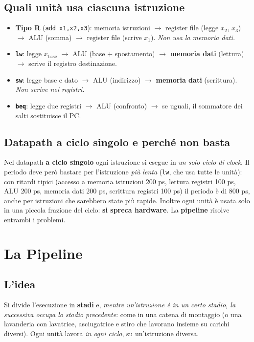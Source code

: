 \subsection{Quali unità usa ciascuna istruzione}
\begin{itemize}
    \item \textbf{Tipo R} (\texttt{add x1,x2,x3}): memoria istruzioni $\to$ register file (legge $x_2$, $x_3$) $\to$ ALU (somma) $\to$ register file (scrive $x_1$). \emph{Non usa la memoria dati.}
    \item \textbf{\texttt{lw}}: legge $x_{\text{base}}$ $\to$ ALU (base $+$ spostamento) $\to$ \textbf{memoria dati} (lettura) $\to$ scrive il registro destinazione.
    \item \textbf{\texttt{sw}}: legge base e dato $\to$ ALU (indirizzo) $\to$ \textbf{memoria dati} (scrittura). \emph{Non scrive nei registri.}
    \item \textbf{\texttt{beq}}: legge due registri $\to$ ALU (confronto) $\to$ se uguali, il sommatore dei salti sostituisce il PC.
\end{itemize}

\subsection{Datapath a ciclo singolo e perché non basta}
Nel datapath \textbf{a ciclo singolo} ogni istruzione si esegue in \emph{un solo ciclo di clock}. Il periodo deve però bastare per l'istruzione \emph{più lenta} (\texttt{lw}, che usa tutte le unità): con ritardi tipici (accesso a memoria istruzioni 200 ps, lettura registri 100 ps, ALU 200 ps, memoria dati 200 ps, scrittura registri 100 ps) il periodo è di $800$ ps, anche per istruzioni che sarebbero state più rapide. Inoltre ogni unità è usata solo in una piccola frazione del ciclo: \textbf{si spreca hardware}. La \textbf{pipeline} risolve entrambi i problemi.

\section{La Pipeline}

\subsection{L'idea}
Si divide l'esecuzione in \textbf{stadi} e, \emph{mentre un'istruzione è in un certo stadio, la successiva occupa lo stadio precedente}: come in una catena di montaggio (o una lavanderia con lavatrice, asciugatrice e stiro che lavorano insieme su carichi diversi). Ogni unità lavora \emph{in ogni ciclo}, su un'istruzione diversa.


